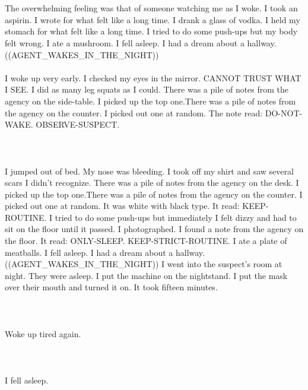 \documentclass{article}
\begin{document}
    \section{}
    The overwhelming feeling was that of someone watching me as I woke. I took an aspirin. I wrote for what felt like a long time. I drank a glass of vodka. I held my stomach for what felt like a long time. I tried to do some push-ups but my body felt wrong. I ate a mushroom. I fell asleep. I had a dream about a hallway. ((AGENT_WAKES_IN_THE_NIGHT)) \\\\I woke up very early. I checked my eyes in the mirror. CANNOT TRUST WHAT I SEE. I did as many leg squats as I could. There was a pile of notes from the agency on the side-table. I picked up the top one.There was a pile of notes from the agency on the counter. I picked out one at random. The note read: DO-NOT-WAKE. OBSERVE-SUSPECT. \\\\
    \newpage
    
    \section{}
    I jumped out of bed. My nose was bleeding. I took off my shirt and saw several scars I didn't recognize. There was a pile of notes from the agency on the desk. I picked up the top one.There was a pile of notes from the agency on the counter. I picked out one at random. It was white with black type. It read: KEEP-ROUTINE. I tried to do some push-ups but immediately I felt dizzy and had to sit on the floor until it passed. I photographed. I found a note from the agency on the floor. It read: ONLY-SLEEP. KEEP-STRICT-ROUTINE. I ate a plate of meatballs. I fell asleep. I had a dream about a hallway. ((AGENT_WAKES_IN_THE_NIGHT)) I went into the suspect's room at night. They were asleep. I put the machine on the nightstand. I put the mask over their mouth and turned it on. It took fifteen minutes. \\\\
    \newpage
    
    \section{}
    Woke up tired again.\\\\ 
    \newpage
    
    \section{}
    I fell asleep.\\\\ 
    \newpage
    
\end{document}
